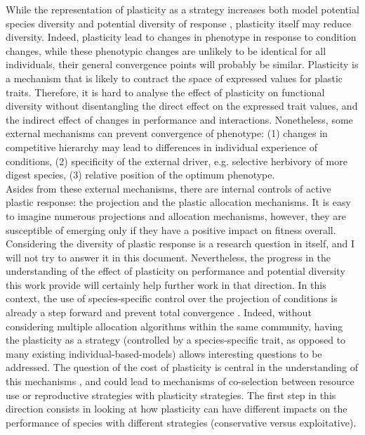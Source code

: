 While the representation of plasticity as a strategy increases both model potential species diversity and potential diversity of response \parencite{ ryser_consequences_2000, kichenin_contrasting_2013}, plasticity itself may reduce diversity. Indeed, plasticity lead to changes in phenotype in response to condition changes, while these phenotypic changes are unlikely to be identical for all individuals, their general convergence points will probably be similar. Plasticity is a mechanism that is likely to contract the space of expressed values for plastic traits. Therefore, it is hard to analyse the effect of plasticity on functional diversity without disentangling the direct effect on the expressed trait values, and the indirect effect of changes in performance and interactions. Nonetheless, some external mechanisms  can prevent convergence of phenotype: (1) changes in competitive hierarchy may lead to differences in individual experience of conditions, (2) specificity of the external driver, e.g. selective herbivory of more digest species, (3) relative position of the optimum phenotype. \\
Asides from these external mechanisms, there are internal controls of active plastic response: the projection and the plastic allocation mechanisms. It is easy to imagine numerous projections and allocation mechanisms, however, they are susceptible of emerging only if they have a positive impact on fitness overall. Considering the diversity of plastic response is a research question in itself, and I will not try to answer it in this document. Nevertheless, the progress in the understanding of the effect of plasticity on performance and potential diversity this work provide will certainly help further work in that direction. In this context, the use of species-specific control over the projection of conditions is already a step forward and prevent total convergence . Indeed, without considering multiple allocation algorithms within the same community, having the plasticity as a strategy \parencite{bradshaw_unravelling_2006} (controlled by a species-specific trait, as opposed to many existing individual-based-models) allows interesting questions to be addressed. The question of the cost of plasticity is central in the understanding of this mechanisms \parencite{dewitt_costs_1998, auld_re-evaluating_2009}, and could lead to mechanisms of co-selection between resource use or reproductive strategies with plasticity strategies. The first step in this direction consists in looking at how plasticity can have different impacts on the performance of species with different strategies (conservative versus exploitative).



